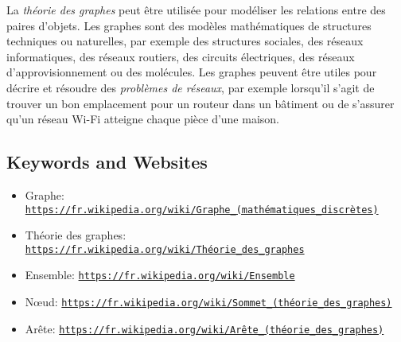 \documentclass[a4paper,11pt]{report}
\newcommand{\BrochureUrlText}[1]{\texttt{#1}}
\newcommand{\taskGraphicsFolder}{..}
\begin{document}
La \emph{théorie des graphes} peut être utilisée pour modéliser les relations entre des paires d’objets. Les graphes sont des modèles mathématiques de structures techniques ou naturelles, par exemple des structures sociales, des réseaux informatiques, des réseaux routiers, des circuits électriques, des réseaux d’approvisionnement ou des molécules. Les graphes peuvent être utiles pour décrire et résoudre des \emph{problèmes de réseaux}, par exemple lorsqu’il s’agit de trouver un bon emplacement pour un routeur dans un bâtiment ou de s’assurer qu’un réseau Wi-Fi atteigne chaque pièce d’une maison.

{\centering%
\par}

{\raggedright

\subsection*{Keywords and Websites}

\begin{itemize}
  \item Graphe: \href{https://fr.wikipedia.org/wiki/Graphe_(math\%C3\%A9matiques_discr\%C3\%A8tes)}{\BrochureUrlText{https://fr.wikipedia.org/wiki/Graphe\_(mathématiques\_discrètes)}}
  \item Théorie des graphes: \href{https://fr.wikipedia.org/wiki/Th\%C3\%A9orie_des_graphes}{\BrochureUrlText{https://fr.wikipedia.org/wiki/Théorie\_des\_graphes}}
  \item Ensemble: \href{https://fr.wikipedia.org/wiki/Ensemble}{\BrochureUrlText{https://fr.wikipedia.org/wiki/Ensemble}}
  \item Nœud: \href{https://fr.wikipedia.org/wiki/Sommet_(th\%C3\%A9orie_des_graphes)}{\BrochureUrlText{https://fr.wikipedia.org/wiki/Sommet\_(théorie\_des\_graphes)}}
  \item Arête: \href{https://fr.wikipedia.org/wiki/Ar\%C3\%AAte_(th\%C3\%A9orie_des_graphes)}{\BrochureUrlText{https://fr.wikipedia.org/wiki/Arête\_(théorie\_des\_graphes)}}
\end{itemize}


}
\end{document}
